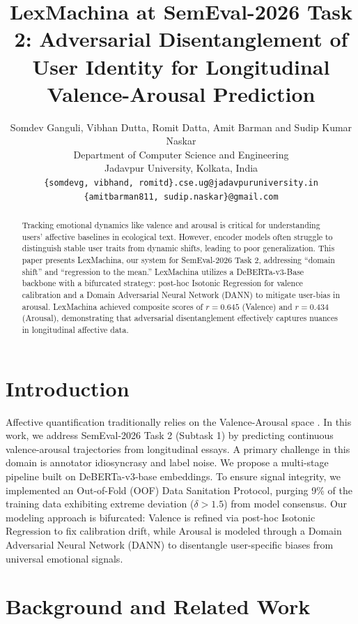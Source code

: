 \documentclass[11pt, a4paper]{article}
\title{LexMachina at SemEval-2026 Task 2: Adversarial Disentanglement of User Identity for Longitudinal Valence-Arousal Prediction}
\author{
  Somdev Ganguli, Vibhan Dutta, Romit Datta, Amit Barman and Sudip Kumar Naskar \\
  Department of Computer Science and Engineering \\
  Jadavpur University, Kolkata, India \\
  \texttt{\{somdevg, vibhand, romitd\}.cse.ug@jadavpuruniversity.in} \\
  \texttt{\{amitbarman811, sudip.naskar\}@gmail.com}
}
\begin{document}
\maketitle

\begin{abstract}
Tracking emotional dynamics like valence and arousal is critical for understanding users' affective baselines in ecological text. However, encoder models often struggle to distinguish stable user traits from dynamic shifts, leading to poor generalization. This paper presents LexMachina, our system for SemEval-2026 Task 2, addressing ``domain shift'' and ``regression to the mean.'' LexMachina utilizes a DeBERTa-v3-Base backbone with a bifurcated strategy: post-hoc Isotonic Regression for valence calibration and a Domain Adversarial Neural Network (DANN) to mitigate user-bias in arousal. LexMachina achieved composite scores of $r=0.645$ (Valence) and $r=0.434$ (Arousal), demonstrating that adversarial disentanglement effectively captures nuances in longitudinal affective data.
\end{abstract}

\section{Introduction}
Affective quantification traditionally relies on the Valence-Arousal space \citep{russell1980circumplex}. In this work, we address SemEval-2026 Task 2 (Subtask 1) \citep{soni-etal-2026-semeval} by predicting continuous valence-arousal trajectories from longitudinal essays. A primary challenge in this domain is annotator idiosyncrasy and label noise. We propose a multi-stage pipeline built on DeBERTa-v3-base \citep{DBLP:journals/corr/abs-2006-03654} embeddings. To ensure signal integrity, we implemented an Out-of-Fold (OOF) Data Sanitation Protocol, purging 9\% of the training data exhibiting extreme deviation ($\delta > 1.5$) from model consensus. Our modeling approach is bifurcated: Valence is refined via post-hoc Isotonic Regression to fix calibration drift, while Arousal is modeled through a Domain Adversarial Neural Network (DANN) to disentangle user-specific biases from universal emotional signals.

\section{Background and Related Work}
\end{document}
